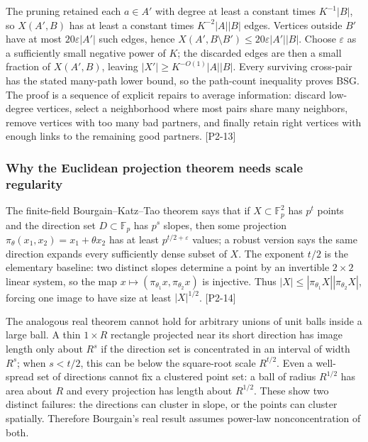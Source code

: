 The pruning retained each \(a\in A'\) with degree at least a constant times \(K^{-1}|B|\), so \(X(A',B)\) has at least a constant times \(K^{-2}|A||B|\) edges. Vertices outside \(B'\) have at most \(20\varepsilon|A'|\) such edges, hence \(X(A',B\setminus B')\le20\varepsilon|A'||B|\). Choose \(\varepsilon\) as a sufficiently small negative power of \(K\); the discarded edges are then a small fraction of \(X(A',B)\), leaving \(|X'|\ge K^{-O(1)}|A||B|\). Every surviving cross-pair has the stated many-path lower bound, so the path-count inequality proves BSG. The proof is a sequence of explicit repairs to average information: discard low-degree vertices, select a neighborhood where most pairs share many neighbors, remove vertices with too many bad partners, and finally retain right vertices with enough links to the remaining good partners. {[}P2-13{]}

\subsubsection{Why the Euclidean projection theorem needs scale regularity}\label{04-visual-computing-ii-ch033-why-the-euclidean-projection-theorem-needs-scale-regularity-1}

The finite-field Bourgain--Katz--Tao theorem says that if \(X\subset\mathbb F_p^2\) has \(p^t\) points and the direction set \(D\subset\mathbb F_p\) has \(p^s\) slopes, then some projection \(\pi_\theta(x_1,x_2)=x_1+\theta x_2\) has at least \(p^{t/2+\varepsilon}\) values; a robust version says the same direction expands every sufficiently dense subset of \(X\). The exponent \(t/2\) is the elementary baseline: two distinct slopes determine a point by an invertible \(2\times2\) linear system, so the map \(x\mapsto(\pi_{\theta_1}x,\pi_{\theta_2}x)\) is injective. Thus \(|X|\le |\pi_{\theta_1}X||\pi_{\theta_2}X|\), forcing one image to have size at least \(|X|^{1/2}\). {[}P2-14{]}

The analogous real theorem cannot hold for arbitrary unions of unit balls inside a large ball. A thin \(1\times R\) rectangle projected near its short direction has image length only about \(R^s\) if the direction set is concentrated in an interval of width \(R^s\); when \(s<t/2\), this can be below the square-root scale \(R^{t/2}\). Even a well-spread set of directions cannot fix a clustered point set: a ball of radius \(R^{1/2}\) has area about \(R\) and every projection has length about \(R^{1/2}\). These show two distinct failures: the directions can cluster in slope, or the points can cluster spatially. Therefore Bourgain's real result assumes power-law nonconcentration of both.

